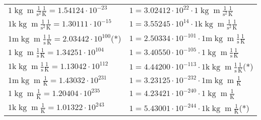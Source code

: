 \begin{center}
\begin{longtable}{l l}
{\color{black}$1 \bm{\mathrm{ }}\operatorname{kg}{\operatorname{m}}\frac1{\operatorname{s}^2}{}\frac1{\operatorname{K}} = 1.54124\cdot10^{-23} $}   & {\color{black}$ 1 = 3.02412\cdot10^{22} \cdot 1 \bm{\mathrm{ }}\operatorname{kg}{\operatorname{m}}\frac1{\operatorname{s}^2}{}\frac1{\operatorname{K}}$}  \\
{\color{gray}$1 \bm{\mathrm{ k}}\operatorname{kg}{\operatorname{m}}\frac1{\operatorname{s}^2}{}\frac1{\operatorname{K}} = 1.30111\cdot10^{-15} $}   & {\color{gray}$ 1 = 3.55245\cdot10^{14} \cdot 1 \bm{\mathrm{ k}}\operatorname{kg}{\operatorname{m}}\frac1{\operatorname{s}^2}{}\frac1{\operatorname{K}}$}  \\
{\color{gray}$1 \bm{\mathrm{ m}}\operatorname{kg}{\operatorname{m}}\frac1{\operatorname{s}}{}\frac1{\operatorname{K}} = 2.03442\cdot10^{100} $}\quad(*) & {\color{gray}$ 1 = 2.50334\cdot10^{-101} \cdot 1 \bm{\mathrm{ m}}\operatorname{kg}{\operatorname{m}}\frac1{\operatorname{s}}{}\frac1{\operatorname{K}}$}  \\
{\color{black}$1 \bm{\mathrm{ }}\operatorname{kg}{\operatorname{m}}\frac1{\operatorname{s}}{}\frac1{\operatorname{K}} = 1.34251\cdot10^{104} $}   & {\color{black}$ 1 = 3.40550\cdot10^{-105} \cdot 1 \bm{\mathrm{ }}\operatorname{kg}{\operatorname{m}}\frac1{\operatorname{s}}{}\frac1{\operatorname{K}}$}  \\
{\color{gray}$1 \bm{\mathrm{ k}}\operatorname{kg}{\operatorname{m}}\frac1{\operatorname{s}}{}\frac1{\operatorname{K}} = 1.13042\cdot10^{112} $}   & {\color{gray}$ 1 = 4.44200\cdot10^{-113} \cdot 1 \bm{\mathrm{ k}}\operatorname{kg}{\operatorname{m}}\frac1{\operatorname{s}}{}\frac1{\operatorname{K}}$}\quad(*)\\
{\color{gray}$1 \bm{\mathrm{ m}}\operatorname{kg}{\operatorname{m}}{}{}\frac1{\operatorname{K}} = 1.43032\cdot10^{231} $}   & {\color{gray}$ 1 = 3.23125\cdot10^{-232} \cdot 1 \bm{\mathrm{ m}}\operatorname{kg}{\operatorname{m}}{}{}\frac1{\operatorname{K}}$}  \\
{\color{black}$1 \bm{\mathrm{ }}\operatorname{kg}{\operatorname{m}}{}{}\frac1{\operatorname{K}} = 1.20404\cdot10^{235} $}   & {\color{black}$ 1 = 4.23421\cdot10^{-240} \cdot 1 \bm{\mathrm{ }}\operatorname{kg}{\operatorname{m}}{}{}\frac1{\operatorname{K}}$}  \\
{\color{gray}$1 \bm{\mathrm{ k}}\operatorname{kg}{\operatorname{m}}{}{}\frac1{\operatorname{K}} = 1.01322\cdot10^{243} $}   & {\color{gray}$ 1 = 5.43001\cdot10^{-244} \cdot 1 \bm{\mathrm{ k}}\operatorname{kg}{\operatorname{m}}{}{}\frac1{\operatorname{K}}$}\quad(*)\\

\end{longtable}
\end{center}
